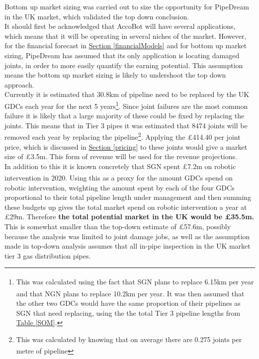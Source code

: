 \documentclass[11pt]{article}		%
\newcommand{\supercite}[1]{\textsuperscript{\cite{#1}}}		%
\newcommand{\tableref}[1]{\hyperref[#1]{Table \ref*{#1}}}     %
\newcommand{\sectref}[1]{\hyperref[#1]{Section \ref*{#1}}}     %
\begin{document}
        Bottom up market sizing was carried out to size the opportunity for PipeDream in the UK market, which validated the top down conclusion.
        \\
        \hspace*{2ex}It should first be acknowledged that AccoBot will have several applications, which means that it will be operating in several niches of the market. However, for the financial forecast in \sectref{financialModels} and for bottom up market sizing, PipeDream has assumed that its only application is locating damaged joints, in order to more easily quantify the earning potential. This assumption means the bottom up market sizing is likely to undershoot the top down approach.
        \\
        \hspace*{2ex}Currently it is estimated that 30.8km of pipeline need to be replaced by the UK GDCs each year for the next 5 years\footnote{This was calculated using the fact that SGN plans to replace 6.15km per year\supercite{SGN_Southern}\supercite{SGN_Scotland} and that NGN plans to replace 10.2km per year\supercite{NGN_decisions}. It was then assumed that the other two GDCs would have the same proportion of their pipelines as SGN that need replacing, using the the total Tier 3 pipeline lengths from \tableref{SOM}.}. Since joint failures are the most common failure it is likely that a large majority of these could be fixed by replacing the joints. This means that in Tier 3 pipes it was estimated that 8474 joints will be removed each year by replacing the pipeline\footnote{This was calculated by knowing that on average there are 0.275 joints per metre of pipeline\supercite{SGN_Southern}}. %
        Applying the £414.40 per joint price, which is discussed in \sectref{pricing}  to these joints would give a market size of £3.5m. This form of revenue will be used for the revenue projections.
        \\
        \hspace*{2ex}In addition to this it is known concretely that SGN spent £7.2m on robotic intervention in 2020\supercite{SGN_Southern}\supercite{SGN_Scotland}. Using this as a proxy for the amount GDCs spend on robotic intervention, weighting the amount spent by each of the four GDCs proportional to their total pipeline length under management and then summing these budgets up gives the total market spend on robotic intervention a year at £29m. Therefore \textbf{the total potential market in the UK would be £35.5m.} This is somewhat smaller than the top-down estimate of £57.6m, possibly because the analysis was limited to joint damage jobs, as well as the assumption made in top-down analysis assumes that all in-pipe inspection in the UK market tier 3 gas distribution pipes. 
    
\end{document}
